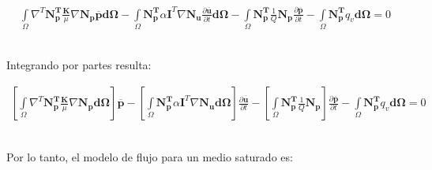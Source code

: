 \begin{ceqn} 
\begin{gather}\label{eq:equ354} 
\int\limits_\Omega \nabla^T\mathbf{N_{p}^T} \frac{\mathbf{K}}{\mu}\nabla \mathbf{N_p}\mathbf{\overline{p}} \mathbf{d\Omega} - \int\limits_\Omega \mathbf{N_{p}^T}\alpha\mathbf{I}^T\nabla\mathbf{N_u}\frac{\partial \mathbf{\overline{u}}}{\partial t} \mathbf{d\Omega}  -\int\limits_\Omega \mathbf{N_{p}^T}\frac{1}{Q}\mathbf{N_p}\frac{\partial \mathbf{\overline{p}}}{\partial t} 
- \int\limits_\Omega \mathbf{N_{p}^T} q_v \mathbf{d\Omega} = 0
\end{gather}  
\end{ceqn}
\\
Integrando por partes resulta:

\begin{ceqn} 
\begin{gather}\label{eq:equ355} 
\left[\int\limits_\Omega \nabla^T\mathbf{N_{p}^T} \frac{\mathbf{K}}{\mu}\nabla \mathbf{N_p} \mathbf{d\Omega}\right]\mathbf{\overline{p}} - \left[\int\limits_\Omega \mathbf{N_{p}^T}\alpha\mathbf{I}^T\nabla\mathbf{N_u} \mathbf{d\Omega}\right]\frac{\partial \mathbf{\overline{u}}}{\partial t}  -\left[\int\limits_\Omega \mathbf{N_{p}^T}\frac{1}{Q}\mathbf{N_p}\right]\frac{\partial \mathbf{\overline{p}}}{\partial t}
- \int\limits_\Omega \mathbf{N_{p}^T} q_v \mathbf{d\Omega} = 0
\end{gather}  
\end{ceqn}
\\
Por lo tanto, el modelo de flujo para un medio saturado es:

